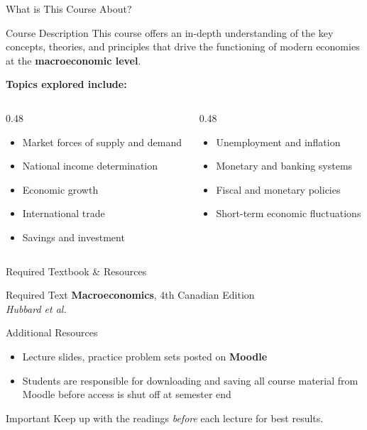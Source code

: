 \documentclass[aspectratio=169]{beamer}
\begin{document}
\begin{frame}{What is This Course About?}
\transfade
\begin{block}{Course Description}
  This course offers an in-depth understanding of the key concepts, theories, and principles that drive the functioning of modern economies at the \textbf{macroeconomic level}.
\end{block}
\vspace{0.5em}
\textbf{Topics explored include:}
\begin{columns}
  \begin{column}{0.48\textwidth}
    \begin{itemize}
      \item Market forces of supply and demand
      \item National income determination
      \item Economic growth
      \item International trade
      \item Savings and investment
    \end{itemize}
  \end{column}
  \begin{column}{0.48\textwidth}
    \begin{itemize}
      \item Unemployment and inflation
      \item Monetary and banking systems
      \item Fiscal and monetary policies
      \item Short-term economic fluctuations
    \end{itemize}
  \end{column}
\end{columns}
\end{frame}

\begin{frame}{Required Textbook \& Resources}
\transfade
\begin{block}{Required Text}
  \textbf{Macroeconomics}, 4th Canadian Edition \\
  \textit{Hubbard et al.}
\end{block}
\vspace{0.5em}
\begin{block}{Additional Resources}
  \begin{itemize}
    \item Lecture slides, practice problem sets posted on \textbf{Moodle}
    \item Students are responsible for downloading and saving all course material from Moodle before access is shut off at semester end
  \end{itemize}
\end{block}
\vspace{0.3em}
\begin{alertblock}{Important}
  Keep up with the readings \textit{before} each lecture for best results.
\end{alertblock}
\end{frame}
\end{document}
